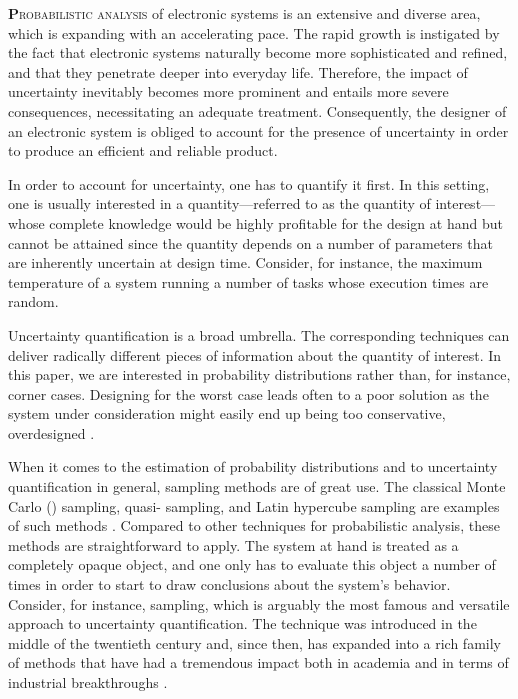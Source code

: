 \lettrine[findent=0.4em, nindent=0em]{\textbf{P}}{robabilistic analysis} of
electronic systems is an extensive and diverse area, which is expanding with an
accelerating pace. The rapid growth is instigated by the fact that electronic
systems naturally become more sophisticated and refined, and that they penetrate
deeper into everyday life. Therefore, the impact of uncertainty inevitably
becomes more prominent and entails more severe consequences, necessitating an
adequate treatment. Consequently, the designer of an electronic system is
obliged to account for the presence of uncertainty in order to produce an
efficient and reliable product.

In order to account for uncertainty, one has to quantify it first. In this
setting, one is usually interested in a quantity---referred to as the quantity
of interest---whose complete knowledge would be highly profitable for the design
at hand but cannot be attained since the quantity depends on a number of
parameters that are inherently uncertain at design time. Consider, for instance,
the maximum temperature of a system running a number of tasks whose execution
times are random.

Uncertainty quantification is a broad umbrella. The corresponding techniques can
deliver radically different pieces of information about the quantity of
interest. In this paper, we are interested in probability distributions rather
than, for instance, corner cases. Designing for the worst case leads often to a
poor solution as the system under consideration might easily end up being too
conservative, overdesigned \cite{quinton2012}.

When it comes to the estimation of probability distributions and to uncertainty
quantification in general, sampling methods are of great use. The classical
Monte Carlo () sampling, quasi- sampling, and Latin hypercube
sampling are examples of such methods \cite{asmussen2007}. Compared to other
techniques for probabilistic analysis, these methods are straightforward to
apply. The system at hand is treated as a completely opaque object, and one only
has to evaluate this object a number of times in order to start to draw
conclusions about the system's behavior. Consider, for instance, 
sampling, which is arguably the most famous and versatile approach to
uncertainty quantification. The technique was introduced in the middle of the
twentieth century and, since then, has expanded into a rich family of methods
that have had a tremendous impact both in academia and in terms of industrial
breakthroughs \cite{asmussen2007}.

